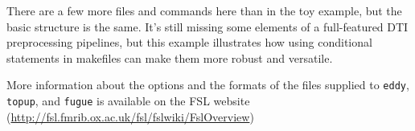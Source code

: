 There are a few more files and commands here than in the toy example, but the basic structure is the same. It's still missing some elements of a full-featured DTI preprocessing pipelines, but this example illustrates how using conditional statements in makefiles can make them more robust and versatile. \break

More information about the options and the formats of the files supplied to \texttt{eddy}, \texttt{topup}, and \texttt{fugue} is available on the FSL website (\url{http://fsl.fmrib.ox.ac.uk/fsl/fslwiki/FslOverview})

